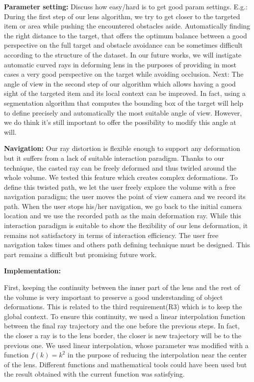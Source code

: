\vspace{0.15cm}
\noindent\textbf{Parameter setting:} Discuss how easy/hard is to get good param settings. E.g.: During the first step of our lens algorithm, we try to get closer to the targeted item or area while pushing the encountered obstacles aside. Automatically finding the right distance to the target, that offers the optimum balance between a good perspective on the full target and obstacle avoidance can be sometimes difficult according to the structure of the dataset. In our future works, we will instigate automatic curved rays in deforming lens in the purposes of providing in most cases a very good perspective on the target while avoiding occlusion. Next: The angle of view in the second step of our algorithm which allows having a good sight of the targeted item and its local context can be improved. In fact, using a segmentation algorithm that computes the bounding box of the target will help to define precisely and automatically the most suitable angle of view. However, we do think it's still important to offer the possibility to modify this angle at will.

\vspace{0.15cm}
\noindent\textbf{Navigation:} Our ray distortion is flexible enough to support any deformation but it suffers from a lack of suitable interaction paradigm. Thanks to our technique, the casted ray can be freely deformed and thus twirled around the whole volume. We tested this feature which creates complex deformations. To define this twisted path, we let the user freely explore the volume with a free navigation paradigm; the user moves the point of view camera and we record its path. When the user stops his/her navigation, we go back to the initial camera location and we use the recorded path as the main deformation ray. While this interaction paradigm is suitable to show the flexibility of our lens deformation, it remains not satisfactory in terms of interaction efficiency. The user free navigation takes times and others path defining technique must be designed. This part remains a difficult but promising future work.

\vspace{0.15cm}
\noindent\textbf{Implementation:}

First, keeping the continuity between the inner part of the lens and the rest of the volume is very important to preserve a good understanding of object deformations. This is related to the third requirement(R3) which is to keep the global context. To ensure this continuity, we used a linear interpolation function between the final ray trajectory and the one before the previous steps. In fact, the closer a ray is to the lens border, the closer is new trajectory will be to the previous one. We used linear interpolation, whose parameter was modified with a function $ f\left(k\right) = k^2$ in the purpose of reducing the interpolation near the center of the lens. Different functions and mathematical tools could have been used but the result obtained with the current function was satisfying.


